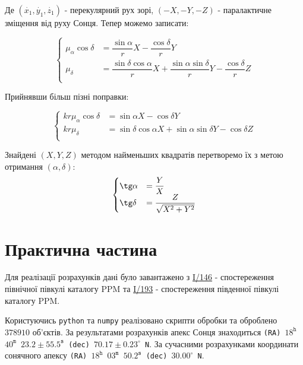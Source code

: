 \documentclass[12pt]{article}
\begin{document}
  Де $(\dot{x_1}, \dot{y_1}, \dot{z_1})$ - перекулярний рух зорі, $(-X, -Y, -Z)$ - паралактичне зміщення від руху Сонця. Тепер можемо записати:

  \begin{equation}
    \begin{cases}
      \mu_{\alpha}\cos\delta &= \dfrac{\sin\alpha}{r}X - \dfrac{\cos\delta}{r}Y\\
      \mu_{\delta} &= \dfrac{\sin\delta\cos\alpha}{r}X + \dfrac{\sin\alpha\sin\delta}{r}Y - \dfrac{\cos\delta}{r}Z\\
    \end{cases}
  \end{equation}

  Прийнявши більш пізні поправки:

  \begin{equation}
    \begin{cases}
      kr\mu_{\alpha}\cos\delta &= \sin\alpha X - \cos\delta Y\\
      kr\mu_{\delta} &= \sin\delta\cos\alpha X + \sin\alpha\sin\delta Y - \cos\delta Z\\
    \end{cases}
  \end{equation}

  Знайдені $(X, Y, Z)$ методом найменьших квадратів перетворемо їх з метою отримання $(\alpha, \delta)$:
  \begin{equation}
    \begin{cases}
      \tg\alpha &= \dfrac{Y}{X}\\
      \tg\delta &= \dfrac{Z}{\sqrt{X^2+Y^2}}\\
    \end{cases}
  \end{equation}

\section*{Практична частина}

  Для реалізації розрахунків дані було завантажено з \href{http://cdsarc.u-strasbg.fr/viz-bin/Cat?target=http&cat=I\%2F146&}{I/146} - спостереження північної півкулі каталогу PPM та \href{http://cdsarc.u-strasbg.fr/viz-bin/Cat?target=http&cat=I\%2F193&}{I/193} - спостереження південної півкулі каталогу PPM.

  Користуючись \texttt{python} та \texttt{numpy} реалізовано скрипти обробки та оброблено $378910$ об'єктів. За результатами розрахунків апекс Сонця знаходиться \texttt{(RA) $18^{\texttt{h}}$ $40^{\texttt{m}}$ $23.2 \pm 55.5^{\texttt{s}}$ (dec) $70.17 \pm 0.23^{\circ}$ N}. За сучасними розрахунками координати сонячного апексу \texttt{(RA) $18^{\texttt{h}}$ $03^{\texttt{m}}$ $50.2^{\texttt{s}}$ (dec) $30.00^{\circ}$ N}.
\end{document}
